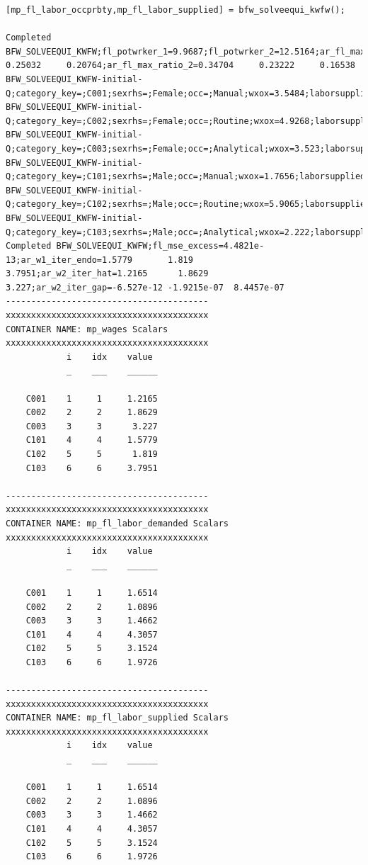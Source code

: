 \documentclass[
]{book}
\begin{document}
\begin{verbatim}
[mp_fl_labor_occprbty,mp_fl_labor_supplied] = bfw_solveequi_kwfw();

Completed BFW_SOLVEEQUI_KWFW;fl_potwrker_1=9.9687;fl_potwrker_2=12.5164;ar_fl_max_ratio_1=0.36095     0.25032     0.20764;ar_fl_max_ratio_2=0.34704     0.23222     0.16538
BFW_SOLVEEQUI_KWFW-initial-Q;category_key=;C001;sexrhs=;Female;occ=;Manual;wxox=3.5484;laborsupplied=2.2735
BFW_SOLVEEQUI_KWFW-initial-Q;category_key=;C002;sexrhs=;Female;occ=;Routine;wxox=4.9268;laborsupplied=1.6222
BFW_SOLVEEQUI_KWFW-initial-Q;category_key=;C003;sexrhs=;Female;occ=;Analytical;wxox=3.523;laborsupplied=1.341
BFW_SOLVEEQUI_KWFW-initial-Q;category_key=;C101;sexrhs=;Male;occ=;Manual;wxox=1.7656;laborsupplied=4.2925
BFW_SOLVEEQUI_KWFW-initial-Q;category_key=;C102;sexrhs=;Male;occ=;Routine;wxox=5.9065;laborsupplied=3.7644
BFW_SOLVEEQUI_KWFW-initial-Q;category_key=;C103;sexrhs=;Male;occ=;Analytical;wxox=2.222;laborsupplied=1.5416
Completed BFW_SOLVEEQUI_KWFW;fl_mse_excess=4.4821e-13;ar_w1_iter_endo=1.5779       1.819      3.7951;ar_w2_iter_hat=1.2165      1.8629       3.227;ar_w2_iter_gap=-6.527e-12 -1.9215e-07  8.4457e-07
----------------------------------------
xxxxxxxxxxxxxxxxxxxxxxxxxxxxxxxxxxxxxxxx
CONTAINER NAME: mp_wages Scalars
xxxxxxxxxxxxxxxxxxxxxxxxxxxxxxxxxxxxxxxx
            i    idx    value 
            _    ___    ______

    C001    1     1     1.2165
    C002    2     2     1.8629
    C003    3     3      3.227
    C101    4     4     1.5779
    C102    5     5      1.819
    C103    6     6     3.7951

----------------------------------------
xxxxxxxxxxxxxxxxxxxxxxxxxxxxxxxxxxxxxxxx
CONTAINER NAME: mp_fl_labor_demanded Scalars
xxxxxxxxxxxxxxxxxxxxxxxxxxxxxxxxxxxxxxxx
            i    idx    value 
            _    ___    ______

    C001    1     1     1.6514
    C002    2     2     1.0896
    C003    3     3     1.4662
    C101    4     4     4.3057
    C102    5     5     3.1524
    C103    6     6     1.9726

----------------------------------------
xxxxxxxxxxxxxxxxxxxxxxxxxxxxxxxxxxxxxxxx
CONTAINER NAME: mp_fl_labor_supplied Scalars
xxxxxxxxxxxxxxxxxxxxxxxxxxxxxxxxxxxxxxxx
            i    idx    value 
            _    ___    ______

    C001    1     1     1.6514
    C002    2     2     1.0896
    C003    3     3     1.4662
    C101    4     4     4.3057
    C102    5     5     3.1524
    C103    6     6     1.9726


\end{verbatim}
\end{document}
